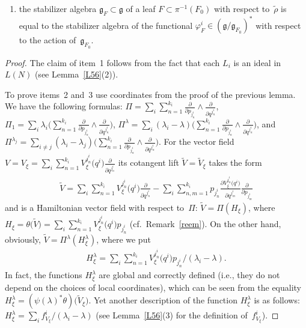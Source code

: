 \begin{Lemma}
\begin{enumerate}
\item[$8)$] the stabilizer algebra $\mathfrak{g}_F \subset \mathfrak{g}$ of a leaf $F \subset \pi^{-1}(F_0)$ with respect to~$\tilde\rho$ is equal to the stabilizer algebra of the functional $\varphi_F^i\in(\mathfrak{g}/\mathfrak{g}_{F_0})^*$ with respect to the action of~$\mathfrak{g}_{F_0}$.
 \end{enumerate}
\end{Lemma}

\begin{proof} The claim of item~1 follows from the fact that each $L_i$ is an ideal in $L(N)$ (see Lemma~\ref{L56}(2)).

To prove items~2 and~3 use coordinates from the proof of the previous lemma. We have the following formulas: $\Pi=\sum\limits_i \sum\limits_{n=1}^{k_i}\frac{\partial }{\partial p_{j^i_n}}\wedge \frac{\partial}{\partial q^{j^i_n } }$, $\Pi_1=\sum\limits_i\lambda_i\big( \sum\limits_{n=1}^{k_i}\frac{\partial }{\partial p_{j^i_n }}\wedge \frac{\partial}{\partial q^{j^i_n } }\big)$,
$\Pi^{\lambda}=\sum\limits_i(\lambda_i-\lambda)\big( \sum\limits_{n=1}^{k_i}\frac{\partial }{\partial p_{j^i_n }}\wedge \frac{\partial}{\partial q^{j^i_n } }\big)$,
and $\Pi^{\lambda_j}=\sum\limits_{i\not=j}(\lambda_i-\lambda_j)\big( \sum\limits_{n=1}^{k_i}\frac{\partial }{\partial p_{j^i_n }}\wedge \frac{\partial}{\partial q^{j^i_n } }\big)$.
For the vector field $V=V_\xi=\sum\limits_i \sum\limits_{n=1}^{k_i}V_\xi^{j^i_n }\big(q^i\big)\frac{\partial}{\partial q^{j^i_n } }$ its cotangent lift $\widetilde{V}=\widetilde{V}_\xi$ takes the form
\begin{gather*}
\widetilde{V}=\sum_i \sum_{n=1}^{k_i}V_\xi^{j^i_n }\big(q^i\big)\frac{\partial}{\partial q^{j^i_n } }-\sum_{i} \sum_{n,m=1}^{k_i}p_{j^i_n }\frac{\partial V_\xi^{j^i_n }\big(q^i\big)}{\partial q^{j^i_m }}\frac{\partial }{\partial p_{j^i_m }}
\end{gather*}
and is a Hamiltonian vector field with respect to~$\Pi$: $\widetilde{V}=\Pi(H_\xi)$, where $H_\xi=\theta\big(\widetilde{V}\big)=\sum\limits_i \sum\limits_{n=1}^{k_i}V_\xi^{j^i_n }\big(q^i\big)p_{j^i_n }$ (cf.\ Remark~\ref{reem}). On the other hand, obviously,
$\widetilde{V}=\Pi^\lambda(H^\lambda_\xi)$, where we put
\begin{gather*}
H^\lambda_\xi=\sum_i \sum_{n=1}^{k_i}V_\xi^{j^i_n }\big(q^i\big)p_{j^i_n }/(\lambda_i-\lambda).
\end{gather*}
In fact, the functions $H^\lambda_\xi$ are global and correctly defined (i.e., they do not depend on the choices of local coordinates), which can be seen from the equality $H^\lambda_\xi=(\psi(\lambda)^*\theta)\big(\widetilde{V}_\xi\big)$. Yet another description of the function $H^\lambda_\xi$ is as follows: $H^\lambda_\xi=\sum_i f^i_{V_\xi}/(\lambda_i-\lambda)$ (see Lemma~\ref{L56}(3) for the definition of~$f^i_{V_\xi}$).


\end{proof}
